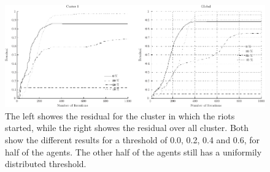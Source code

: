 \begin{figure}
  \centering
  \includegraphics[width= \textwidth]{influenceOffixedthresholds/thresholdinfuence.pdf}
  \caption{The left showes the residual for the cluster in which the riots started, while the right showes the residual over all cluster. Both show the different results for a threshold of 0.0, 0.2, 0.4 and 0.6, for half of the agents. The other half of the agents still has a uniformily distributed threshold.} 
  \label{influencethresholdplot}
\end{figure}





